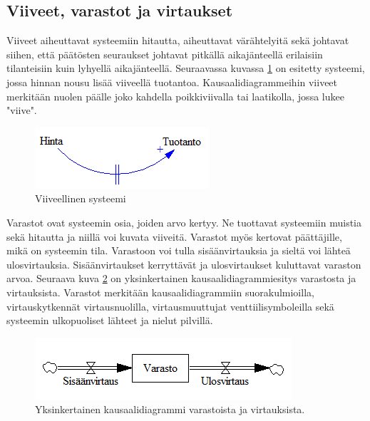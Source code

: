 \documentclass[finnish,12pt,a4paper,pdftex]{article}
\begin{document}
\begin{onehalfspacing}
\subsection{Viiveet, varastot ja virtaukset \label{sysdyn:vvv}}

Viiveet aiheuttavat systeemiin hitautta, aiheuttavat värähtelyitä sekä johtavat siihen, että päätösten seuraukset johtavat pitkällä aikajänteellä erilaisiin tilanteisiin kuin lyhyellä aikajänteellä. Seuraavassa kuvassa \ref{sysdyn:viive} on esitetty systeemi, jossa hinnan nousu lisää viiveellä tuotantoa. Kausaalidiagrammeihin viiveet merkitään nuolen päälle joko kahdella poikkiviivalla tai laatikolla, jossa lukee "viive". \cite[s. 150--152]{Sterman2000} 

\begin{figure}[H]
\centering \includegraphics{viive}
\caption{Viiveellinen systeemi \cite[s. 150]{Sterman2000} \label{sysdyn:viive}}
\end{figure}

Varastot ovat systeemin osia, joiden arvo kertyy. Ne tuottavat systeemiin muistia sekä hitautta ja niillä voi kuvata viiveitä. Varastot myös kertovat päättäjille, mikä on systeemin tila. Varastoon voi tulla sisäänvirtauksia ja sieltä voi lähteä ulosvirtauksia. Sisäänvirtaukset kerryttävät ja ulosvirtaukset kuluttavat varaston arvoa. Seuraava kuva \ref{sysdyn:varastovirtaus} on yksinkertainen kausaalidiagrammiesitys varastosta ja virtauksista. Varastot merkitään kausaalidiagrammiin suorakulmioilla, virtauskytkennät virtausnuolilla, virtausmuuttujat venttiilisymboleilla sekä systeemin ulkopuoliset lähteet ja nielut pilvillä. \cite[s. 191--197]{Sterman2000} 

\begin{figure}[H]
\centering \includegraphics{varastovirtaus}
\caption{Yksinkertainen kausaalidiagrammi varastoista ja virtauksista. \cite[s. 150]{Sterman2000} \label{sysdyn:varastovirtaus}}
\end{figure}


\end{onehalfspacing}
\end{document}
